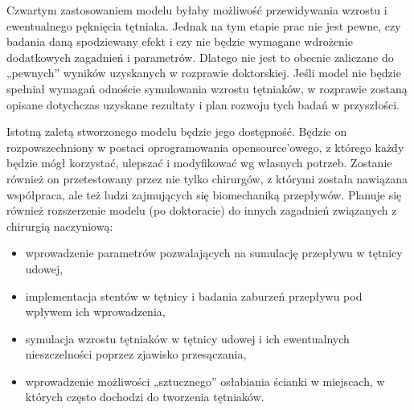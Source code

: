 \documentclass[11pt]{article} %
\begin{document}
Czwartym zastosowaniem modelu byłaby możliwość przewidywania wzrostu i ewentualnego pęknięcia tętniaka. Jednak na tym etapie prac nie jest pewne, czy badania daną spodziewany efekt i czy nie będzie wymagane wdrożenie dodatkowych zagadnień i parametrów. Dlatego nie jest to obecnie zaliczane do „pewnych” wyników uzyskanych w rozprawie doktorskiej. Jeśli model nie będzie spełniał wymagań odnoście symulowania wzrostu tętniaków, w rozprawie zostaną opisane dotychczas uzyskane rezultaty i plan rozwoju tych badań w przyszłości.


Istotną zaletą stworzonego modelu będzie jego dostępność. Będzie on rozpowszechniony w postaci oprogramowania opensource’owego, z którego każdy będzie mógł korzystać, ulepszać i modyfikować wg własnych potrzeb. Zostanie również on przetestowany przez nie tylko chirurgów, z którymi została nawiązana współpraca, ale też ludzi zajmujących się biomechaniką przepływów. 
Planuje się również rozszerzenie modelu (po doktoracie) do innych zagadnień związanych z chirurgią naczyniową:
\begin{itemize}
\item wprowadzenie parametrów pozwalających na sumulację przepływu w tętnicy udowej,
\item implementacja stentów w tętnicy i badania zaburzeń przepływu pod wpływem ich wprowadzenia,
\item symulacja wzrostu tętniaków w tętnicy udowej i ich ewentualnych nieszczelności poprzez zjawisko przesączania,
\item wprowadzenie możliwości „sztucznego” osłabiania ścianki w miejscach, w których często dochodzi do tworzenia tętniaków.
\end{itemize}







\end{document}
